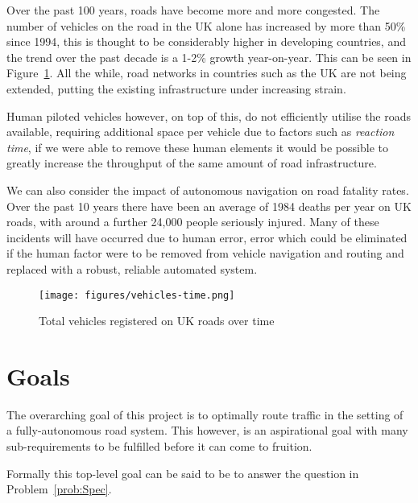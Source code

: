 
Over the past 100 years, roads have become more and more congested. The number of vehicles on the road in the UK alone has increased by more than 50\% since 1994\cite{AllVehiclesVEH01}, this is thought to be considerably higher in developing countries, and the trend over the past decade is a 1-2\% growth year-on-year. This can be seen in Figure~\ref{fig:vehicles-time}. All the while, road networks in countries such as the UK are not being extended, putting the existing infrastructure under increasing strain.

Human piloted vehicles however, on top of this, do not efficiently utilise the roads available, requiring additional space per vehicle due to factors such as \textit{reaction time}, if we were able to remove these human elements it would be possible to greatly increase the throughput of the same amount of road infrastructure.

We can also consider the impact of autonomous navigation on road fatality rates. Over the past 10 years there have been an average of 1984 deaths per year on UK roads\cite{ReportedRoadCasualties}, with around a further 24,000 people seriously injured. Many of these incidents will have occurred due to human error, error which could be eliminated if the human factor were to be removed from vehicle navigation and routing and replaced with a robust, reliable automated system.


\begin{figure}[ht]
  \centering
  \texttt{[image: figures/vehicles-time.png]}
  \caption{\label{fig:vehicles-time} Total vehicles registered on UK roads over time\cite{AllVehiclesVEH01}}
\end{figure}


\section{Goals}

The overarching goal of this project is to optimally route traffic in the setting of a fully-autonomous road system. This however, is an aspirational goal with many sub-requirements to be fulfilled before it can come to fruition.

Formally this top-level goal can be said to be to answer the question in Problem~\ref{prob:Spec}.

